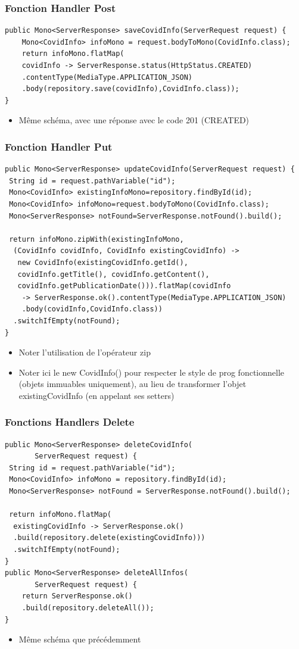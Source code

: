 \documentclass{beamer}
\begin{document}
\begin{frame}[fragile]
	\frametitle{Fonction Handler Post}
\begin{lstlisting}
public Mono<ServerResponse> saveCovidInfo(ServerRequest request) {
	Mono<CovidInfo> infoMono = request.bodyToMono(CovidInfo.class);
	return infoMono.flatMap(
	covidInfo -> ServerResponse.status(HttpStatus.CREATED)
	.contentType(MediaType.APPLICATION_JSON)
	.body(repository.save(covidInfo),CovidInfo.class));
}
\end{lstlisting}	
	\begin{itemize}
		\item Même schéma, avec une réponse avec le code 201 (CREATED)
	\end{itemize}
\end{frame}

\begin{frame}[fragile]
	\frametitle{Fonction Handler Put}
\begin{lstlisting}[basicstyle=\tiny]
public Mono<ServerResponse> updateCovidInfo(ServerRequest request) {
 String id = request.pathVariable("id");
 Mono<CovidInfo> existingInfoMono=repository.findById(id); 
 Mono<CovidInfo> infoMono=request.bodyToMono(CovidInfo.class);	 
 Mono<ServerResponse> notFound=ServerResponse.notFound().build();
 
 return infoMono.zipWith(existingInfoMono,
  (CovidInfo covidInfo, CovidInfo existingCovidInfo) ->
   new CovidInfo(existingCovidInfo.getId(),
   covidInfo.getTitle(), covidInfo.getContent(),
   covidInfo.getPublicationDate())).flatMap(covidInfo 
    -> ServerResponse.ok().contentType(MediaType.APPLICATION_JSON)
    .body(covidInfo,CovidInfo.class))
  .switchIfEmpty(notFound);
}
\end{lstlisting}
	\begin{itemize}
		\item Noter l'utilisation de l'opérateur zip		
		\item Noter ici le new CovidInfo() pour respecter le style de prog fonctionnelle
		(objets immuables uniquement), au lieu de transformer l'objet existingCovidInfo (en appelant ses setters)
	\end{itemize}
\end{frame}

\begin{frame}[fragile]
	\frametitle{Fonctions Handlers Delete}
\begin{lstlisting}
public Mono<ServerResponse> deleteCovidInfo(
       ServerRequest request) {
 String id = request.pathVariable("id");
 Mono<CovidInfo> infoMono = repository.findById(id);
 Mono<ServerResponse> notFound = ServerResponse.notFound().build();
	
 return infoMono.flatMap(
  existingCovidInfo -> ServerResponse.ok()
  .build(repository.delete(existingCovidInfo)))
  .switchIfEmpty(notFound);
}
public Mono<ServerResponse> deleteAllInfos(
       ServerRequest request) {
	return ServerResponse.ok()
	.build(repository.deleteAll());
}
\end{lstlisting}	
	\begin{itemize}
		\item Même schéma que précédemment
	\end{itemize}
\end{frame}
\end{document}
